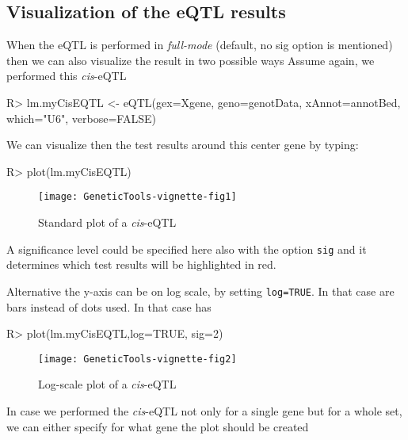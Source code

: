 \documentclass[a4paper,10pt]{article}
\begin{document}
\subsection{Visualization of the eQTL results}

When the eQTL is performed in \textit{full-mode} (default, no sig option is mentioned) then we can also visualize the result in two possible ways
Assume again, we performed this \textit{cis}-eQTL
\begin{Schunk}
\begin{Sinput}
R> lm.myCisEQTL <- eQTL(gex=Xgene, geno=genotData, xAnnot=annotBed, which="U6", verbose=FALSE)
\end{Sinput}
\end{Schunk}

We can visualize then the test results around this center gene by typing:

\begin{Schunk}
\begin{Sinput}
R> plot(lm.myCisEQTL)
\end{Sinput}
\end{Schunk}

\begin{figure}
\begin{center}
\texttt{[image: GeneticTools-vignette-fig1]}
\end{center}
\caption{Standard plot of a \textit{cis}-eQTL}
\label{fig:fig1plot}
\end{figure}

A significance level could be specified here also with the option \texttt{sig} and it determines which test results will be highlighted in red.

Alternative the y-axis can be on log scale, by setting \texttt{log=TRUE}. In that case are bars instead of dots used. In that case has 

\begin{Schunk}
\begin{Sinput}
R> plot(lm.myCisEQTL,log=TRUE, sig=2)
\end{Sinput}
\end{Schunk}

\begin{figure}
\begin{center}
\texttt{[image: GeneticTools-vignette-fig2]}
\end{center}
\caption{Log-scale plot of a \textit{cis}-eQTL}
\label{fig:fig2plot}
\end{figure}

In case we performed the \textit{cis}-eQTL not only for a single gene but for a whole set, we can either specify for what
gene the plot should be created
\end{document}
